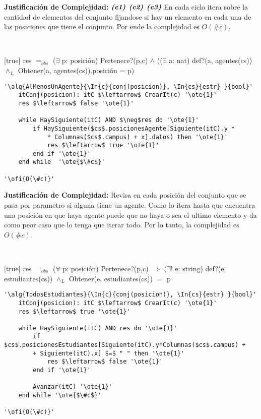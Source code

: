 \textbf{Justificación de Complejidad:} $\textit{\textbf{(c1)}}$ $\textit{\textbf{(c2)}}$ $\textit{\textbf{(c3)}}$ En cada ciclo itera sobre la cantidad de elementos del conjunto fijandose si hay un elemento en cada una de las posiciones que tiene el conjunto. Por ende la complejidad es $O(\#c)$.

~


[true]
{res $=_{obs}$ ($\exists$ p: posición) Pertenece?(p,c) $\land$ (($\exists$ a: nat) def?(a, agentes(cs)) $\land_L$ Obtener(a, agentes(cs)).posición = p)}

\begin{lstlisting}[mathescape]
'\alg{AlMenosUnAgente}{\In{c}{conj(posicion)}, \In{cs}{estr} }{bool}'
	itConj(posicion): itC $\leftarrow$ CrearIt(c) '\ote{1}'
	res $\leftarrow$ false '\ote{1}'

	while HaySiguiente(itC) AND $\neg$res do '\ote{1}'
		if HaySiguiente($cs$.posicionesAgente[Siguiente(itC).y *
			* Columnas($cs$.campus) + x].datos)	then '\ote{1}'
			res $\leftarrow$ true '\ote{1}'
		end if '\ote{1}'
	end while  '\ote{$\#c$}'

'\ofi{O(\#c)}'
\end{lstlisting}

\textbf{Justificación de Complejidad:} Revisa en cada posición del conjunto que se pasa por parametro si alguna tiene un agente. Como lo itera hasta que encuentra una posición en que haya agente puede que no haya o sea el ultimo elemento y da como peor caso que lo tenga que iterar todo. Por lo tanto, la complejidad es $O(\#c)$.

~


[true]
{res $=_{obs}$ ($\forall$ p: posición) Pertenece?(p,c) $\Rightarrow$ ($\exists!$ e: string) def?(e, estudiantes(cs)) $\land_L$ Obtener(e, estudiantes(cs)) $=$ p}

\begin{lstlisting}[mathescape]
'\alg{TodosEstudiantes}{\In{c}{conj(posicion)}, \In{cs}{estr} }{bool}'
	itConj(posicion): itC $\leftarrow$ CrearIt(c) '\ote{1}'
	res $\leftarrow$ true '\ote{1}'

	while HaySiguiente(itC) AND res do '\ote{1}'
		if $cs$.posicionesEstudiantes[Siguiente(itC).y*Columnas($cs$.campus) +
		+ Siguiente(itC).x] $=$ " " then '\ote{1}'
			res $\leftarrow$ false '\ote{1}'
		end if '\ote{1}'

		Avanzar(itC) '\ote{1}'
	end while '\ote{$\#c$}'

'\ofi{O(\#c)}'
\end{lstlisting}

